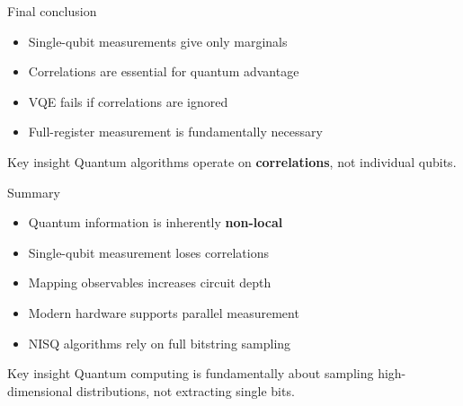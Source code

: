 \documentclass[aspectratio=169]{beamer}
\begin{document}
\begin{frame}{Final conclusion}
\begin{itemize}
\item Single-qubit measurements give only marginals
\item Correlations are essential for quantum advantage
\item VQE fails if correlations are ignored
\item Full-register measurement is fundamentally necessary
\end{itemize}

\medskip

\begin{block}{Key insight}
Quantum algorithms operate on \textbf{correlations}, not individual qubits.
\end{block}
\end{frame}




\begin{frame}{Summary}
\begin{itemize}
\item Quantum information is inherently \textbf{non-local}
\item Single-qubit measurement loses correlations
\item Mapping observables increases circuit depth
\item Modern hardware supports parallel measurement
\item NISQ algorithms rely on full bitstring sampling
\end{itemize}

\medskip

\begin{block}{Key insight}
Quantum computing is fundamentally about sampling high-dimensional distributions, not extracting single bits.
\end{block}
\end{frame}

\end{document}
